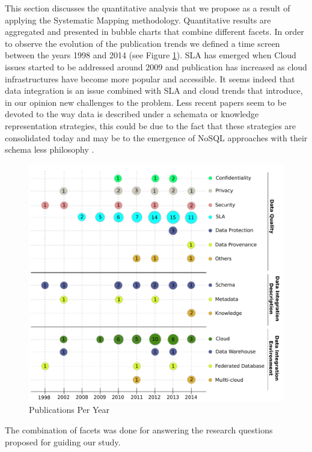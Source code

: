 This section discusses the quantitative analysis that we propose as a result of applying the Systematic Mapping methodology.
Quantitative results are aggregated and presented in bubble charts that combine different facets. 
In order to observe the evolution of the publication trends we defined a time screen between the years 1998 and 2014 (see Figure \ref{fig:pubperyear}). SLA has emerged when Cloud issues started to be addressed around 2009 and publication has increased as cloud infrastructures have become more popular and accessible. It seems indeed that data integration is an issue combined with SLA and cloud trends that introduce, in our opinion new challenges to the problem. Less recent papers seem to be devoted to the way data is described under a schemata or knowledge representation strategies, this could be due to the fact that these strategies are consolidated today and may be to the emergence of NoSQL approaches with their schema less philosophy \cite{sadalage2012nosql}. 

\begin{figure}[h!]
\centering
\includegraphics[scale=0.42]{figs/bubble-charts/PublicationsPerYear.pdf} 
\caption{Publications Per Year}\label{fig:pubperyear}
\end{figure}



The combination of facets was done for answering the research questions proposed for guiding our study.

